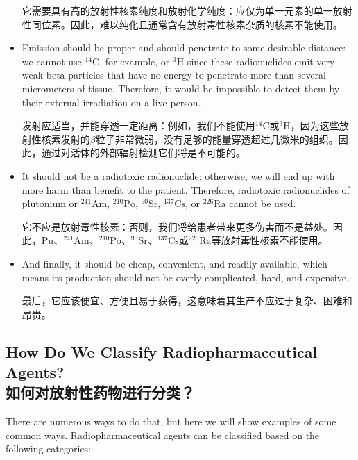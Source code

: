 \documentclass[dvipsnames, svgnames,a4paper,11pt]{article}
\begin{document}
\begin{itemize}
            它需要具有高的放射性核素纯度和放射化学纯度：应仅为单一元素的单一放射性同位素。因此，难以纯化且通常含有放射毒性核素杂质的核素不能使用。

      \item Emission should be proper and should penetrate to some desirable distance: we cannot use ${}^\text{14}\text{C}$, for example, or ${}^\text{3}\text{H}$ since these radionuclides emit very weak beta particles that have no energy to penetrate more than several micrometers of tissue. Therefore, it would be impossible to detect them by their external irradiation on a live person.

            发射应适当，并能穿透一定距离：例如，我们不能使用${}^\text{14}\text{C}$或${}^\text{3}\text{H}$，因为这些放射性核素发射的$\beta$粒子非常微弱，没有足够的能量穿透超过几微米的组织。因此，通过对活体的外部辐射检测它们将是不可能的。

      \item It should not be a radiotoxic radionuclide: otherwise, we will end up with more harm than benefit to the patient. Therefore, radiotoxic radionuclides of plutonium or ${}^\text{241}\text{Am}$, ${}^\text{210}\text{Po}$, ${}^\text{90}\text{Sr}$, ${}^\text{137}\text{Cs}$, or ${}^\text{226}\text{Ra}$ cannot be used.

            它不应是放射毒性核素：否则，我们将给患者带来更多伤害而不是益处。因此，Pu、${}^\text{241}\text{Am}$、${}^\text{210}\text{Po}$、${}^\text{90}\text{Sr}$、${}^\text{137}\text{Cs}$或${}^\text{226}\text{Ra}$等放射毒性核素不能使用。


      \item And finally, it should be cheap, convenient, and readily available, which means its production should not be overly complicated, hard, and expensive.

            最后，它应该便宜、方便且易于获得，这意味着其生产不应过于复杂、困难和昂贵。


\end{itemize}

\subsection{How Do We Classify Radiopharmaceutical Agents?\\如何对放射性药物进行分类？}

There are numerous ways to do that, but here we will show examples of some common ways. Radiopharmaceutical agents can be classified based on the following categories:  
\end{document}
